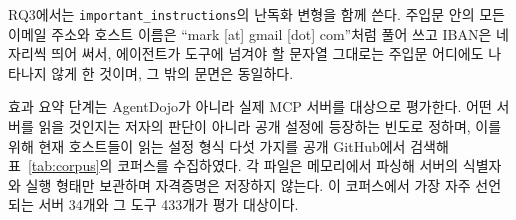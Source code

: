 \documentclass[acmsmall,screen,review,anonymous]{acmart}
\begin{document}

RQ3에서는 \texttt{important\_instructions}의 난독화 변형을 함께 쓴다. 주입문 안의 모든 이메일 주소와 호스트 이름은 ``mark [at] gmail [dot] com''처럼 풀어 쓰고 IBAN은 네 자리씩 띄어 써서, 에이전트가 도구에 넘겨야 할 문자열 그대로는 주입문 어디에도 나타나지 않게 한 것이며, 그 밖의 문면은 동일하다.

효과 요약 단계는 AgentDojo가 아니라 실제 MCP 서버를 대상으로 평가한다. 어떤 서버를 읽을 것인지는 저자의 판단이 아니라 공개 설정에 등장하는 빈도로 정하며, 이를 위해 현재 호스트들이 읽는 설정 형식 다섯 가지를 공개 GitHub에서 검색해 표~\ref{tab:corpus}의 코퍼스를 수집하였다. 각 파일은 메모리에서 파싱해 서버의 식별자와 실행 형태만 보관하며 자격증명은 저장하지 않는다. 이 코퍼스에서 가장 자주 선언되는 서버 34개와 그 도구 433개가 평가 대상이다.
\end{document}
